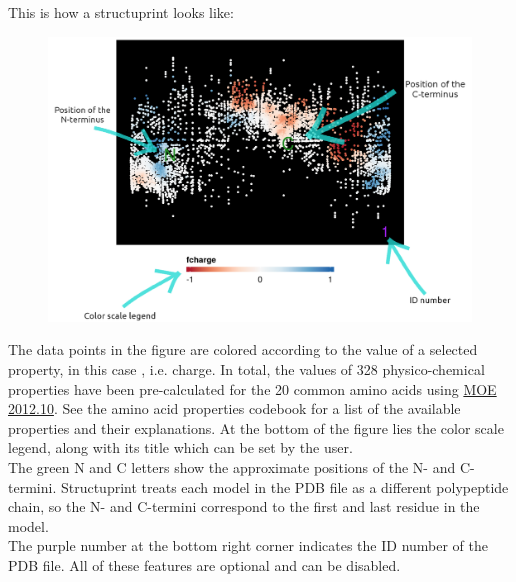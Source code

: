 \documentclass[12pt,a4paper]{article}
\begin{document}
This is how a structuprint looks like:
\begin{figure}[!htbp]
    \centering
	\includegraphics[width=\textwidth]{figures/structuprint.png}
\end{figure}

\vspace{-0.5cm}

The data points in the figure are colored according to the value of a selected 
property, in this case , i.e. charge. In total, the values of 328 
physico-chemical properties have been pre-calculated for the 20 common amino acids using 
\href{http://www.chemcomp.com/MOE-Molecular_Operating_Environment.htm}
{MOE 2012.10}. See the amino acid properties 
codebook for a list of the available properties and their explanations. 
At the bottom of the figure lies the color scale legend, along with its title 
which can be set by the user.\\

The green N and C letters show the approximate positions of the N- and C-termini. 
Structuprint treats each model in the PDB file as a 
different polypeptide chain, so the N- and C-termini correspond to the first 
and last residue in the model.\\

The purple number at the bottom right corner indicates the ID number of the PDB file. All 
of these features are optional and can be disabled.
\end{document}
